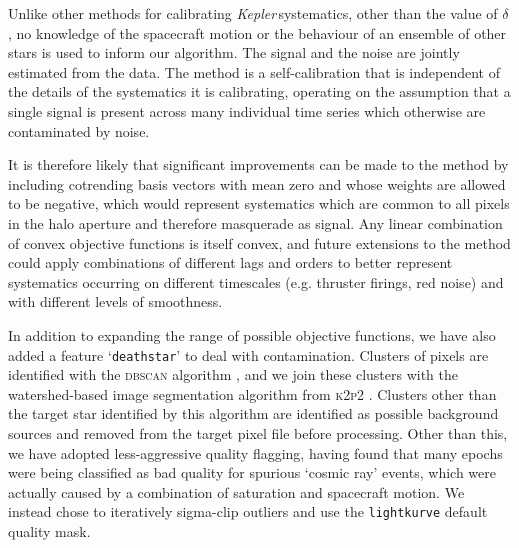 \documentclass[modern]{aastex62}
\newcommand\kepler{\emph{Kepler}\,}
\begin{document}
Unlike other methods for calibrating \kepler systematics, other than the value of $\delta$, no knowledge of the spacecraft motion or the behaviour of an ensemble of other stars is used to inform our algorithm. The signal and the noise are jointly estimated from the data. The method is a self-calibration that is independent of the details of the systematics it is calibrating, operating on the assumption that a single signal is present across many individual time series which otherwise are contaminated by noise. 

It is therefore likely that significant improvements can be made to the method by including cotrending basis vectors with mean zero and whose weights are allowed to be negative, which would represent systematics which are common to all pixels in the halo aperture and therefore masquerade as signal. Any linear combination of convex objective functions is itself convex, and future extensions to the method could apply combinations of different lags and orders to better represent systematics occurring on different timescales (e.g. thruster firings, red noise) and with different levels of smoothness.


In addition to expanding the range of possible objective functions, we have also added a feature `\texttt{deathstar}' to deal with contamination. Clusters of pixels are identified with the \textsc{dbscan} algorithm \citep[Density-Based Spatial Clustering of Applications with Noise;][]{dbscan}, and we join these clusters with the watershed-based image segmentation algorithm from \textsc{k2p2} \citep{k2p2}. Clusters other than the target star identified by this algorithm are identified as possible background sources and removed from the target pixel file before processing. Other than this, we have adopted less-aggressive quality flagging, having found that many epochs were being classified as bad quality for spurious `cosmic ray' events, which were actually caused by a combination of saturation and spacecraft motion. We instead chose to iteratively sigma-clip outliers and use the \texttt{lightkurve} \citep{lightkurve} default quality mask.
\end{document}
